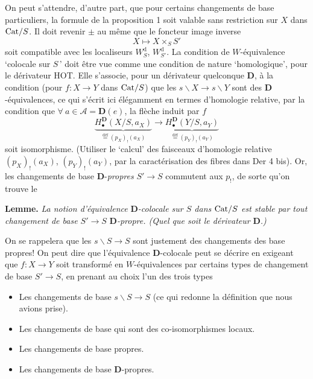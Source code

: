 \bigskip

On peut s'attendre, d'autre part, que pour certains changements de base particuliers, la formule de la proposition 1 soit valable sans restriction sur $X$ dans $\mathrm{Cat}/S$. Il doit revenir $\pm$ au même que le foncteur image inverse
\[
X \longmapsto X \times_S S'
\]
soit compatible avec les localiseurs $W_S^{\mathrm{d}}$, $W_{S'}^{\mathrm{d}}$. La condition de $W$-équivalence `colocale sur $S$\,' doit être vue comme une condition de nature `homologique', pour le dérivateur HOT. Elle s'associe, pour un dérivateur quelconque $\mathbf{D}$, à la condition (pour $f : X \longrightarrow Y$ dans $\mathrm{Cat}/S$) que les $s\backslash X \longrightarrow s\backslash Y$ sont des $\mathbf{D}$-équivalences,
ce qui s'écrit ici élégamment en termes d'homologie relative, par la condition que $\forall\ a \in \mathcal{A} = \mathbf{D}(e)$, la flèche induit par $f$ %
\[
\underbrace{H_\bullet^{\mathbf{D}}(X/S, a_X)}_{\overset{\text{déf}}{=}(p_X)_!(a_X)} \longrightarrow \underbrace{H_\bullet^{\mathbf{D}}(Y/S, a_Y)}_{\overset{\text{déf}}{=}(p_Y)_!(a_Y)}
\]
soit isomorphisme. (Utiliser le `calcul' des faisceaux d'homologie relative $(p_X)_!(a_X)$, $(p_Y)_!(a_Y)$, par la caractérisation des fibres dans Der 4 bis). Or, les changements de base $\mathbf{D}$-\textit{propres} $S' \longrightarrow S$ commutent aux $p_!$, de sorte qu'on trouve le

\textbf{Lemme.} \textit{La notion d'équivalence} $\mathbf{D}$\textit{-colocale sur $S$ dans} $\mathrm{Cat}/S$ \textit{est stable par tout changement de base $S' \longrightarrow S$} $\mathbf{D}$\textit{-propre. (Quel que soit le dérivateur} $\mathbf{D}$\textit{.)}

On se rappelera que les $s\backslash S \longrightarrow S$ sont justement des changements des base propres! On %
peut dire que l'équivalence $\mathbf{D}$-colocale peut se décrire en exigeant que $f : X \longrightarrow Y$ soit transformé en $W$-équivalences par certains types de changement de base $S' \longrightarrow S$, en prenant au choix l'un des trois types

\begin{itemize}
\item[a)] Les changements de base $s\backslash S \longrightarrow S$ (ce qui redonne la définition que nous avions prise).
\item[b)] Les changements de base qui sont des co-isomorphismes locaux.
\item[c)] Les changements de base propres.
\item[d)] Les changements de base $\mathbf{D}$-propres.
\end{itemize}

